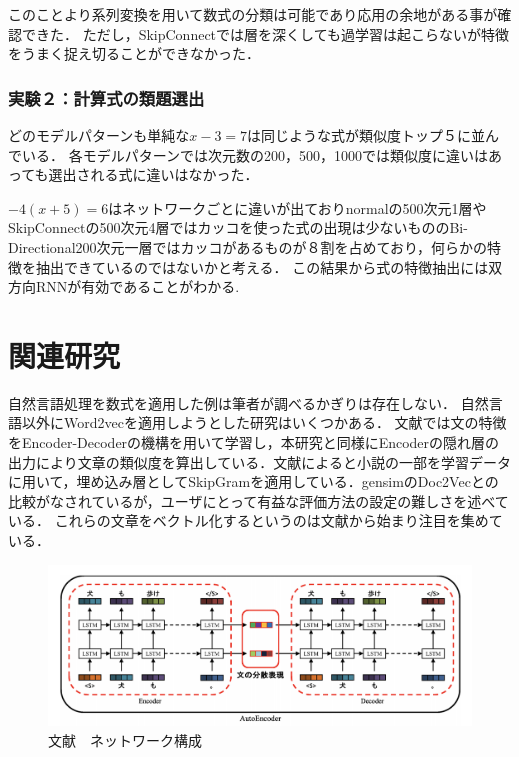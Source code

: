 \documentclass[a4j,11pt,report]{jsbook}
\begin{document}
このことより系列変換を用いて数式の分類は可能であり応用の余地がある事が確認できた．
ただし，SkipConnectでは層を深くしても過学習は起こらないが特徴をうまく捉え切ることができなかった．

\subsection{実験２：計算式の類題選出}

どのモデルパターンも単純な$x-3=7$は同じような式が類似度トップ５に並んでいる．
各モデルパターンでは次元数の200，500，1000では類似度に違いはあっても選出される式に違いはなかった．

$-4(x+5)=6$はネットワークごとに違いが出ておりnormalの500次元1層やSkipConnectの500次元4層ではカッコを使った式の出現は少ないもののBi-Directional200次元一層ではカッコがあるものが８割を占めており，何らかの特徴を抽出できているのではないかと考える．
この結果から式の特徴抽出には双方向RNNが有効であることがわかる.



\chapter{関連研究\label{ch:relsatedwork}}
自然言語処理を数式を適用した例は筆者が調べるかぎりは存在しない．
自然言語以外にWord2vecを適用しようとした研究はいくつかある．
文献\cite{kannrenn3}では文の特徴をEncoder-Decoderの機構を用いて学習し，本研究と同様にEncoderの隠れ層の出力により文章の類似度を算出している．文献\cite{kannrenn3}によると小説の一部を学習データに用いて，埋め込み層としてSkipGramを適用している．gensimのDoc2Vecとの比較がなされているが，ユーザにとって有益な評価方法の設定の難しさを述べている．
これらの文章をベクトル化するというのは文献\cite{1612.06778}から始まり注目を集めている．

\begin{center}
  \begin{figure}[H]
    \centering
    \includegraphics[width=\linewidth]{image/lstm_hidden_vecter.png}
    \caption{文献\cite{kannrenn3}　ネットワーク構成}
    \label{fig:kannrenn3fig}
  \end{figure}
\end{center}
\end{document}
